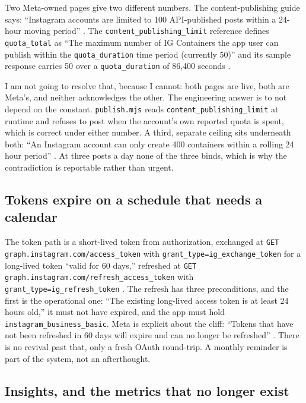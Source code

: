 \documentclass[10pt,letterpaper,twocolumn]{article}
\newcommand{\code}[1]{\texttt{#1}}
\begin{document}
Two Meta-owned pages give two different numbers. The content-publishing guide
says: ``Instagram accounts are limited to 100 API-published posts within a
24-hour moving period'' \cite{metaPublishing}. The
\code{content\_publishing\_limit} reference defines \code{quota\_total} as ``The
maximum number of IG Containers the app user can publish within the
\code{quota\_duration} time period (currently 50)'' and its sample response
carries 50 over a \code{quota\_duration} of 86,400 seconds \cite{metaLimit}.

I am not going to resolve that, because I cannot: both pages are live, both are
Meta's, and neither acknowledges the other. The engineering answer is to not
depend on the constant. \code{publish.mjs} reads
\code{content\_publishing\_limit} at runtime and refuses to post when the
account's own reported quota is spent, which is correct under either number. A
third, separate ceiling sits underneath both: ``An Instagram account can only
create 400 containers within a rolling 24 hour period'' \cite{metaMedia}. At
three posts a day none of the three binds, which is why the contradiction is
reportable rather than urgent.

\subsection{Tokens expire on a schedule that needs a calendar}

The token path is a short-lived token from authorization, exchanged at
\code{GET graph.\allowbreak instagram.\allowbreak com/\allowbreak access\_token} with
\code{grant\_type=ig\_exchange\_token} for a long-lived token ``valid for 60
days,'' refreshed at \code{GET graph.\allowbreak instagram.\allowbreak com/\allowbreak refresh\_\allowbreak access\_token} with
\code{grant\_type=ig\_refresh\_token} \cite{metaBusinessLogin}. The refresh has
three preconditions, and the first is the operational one: ``The existing
long-lived access token is at least 24 hours old,'' it must not have expired,
and the app must hold \code{instagram\_business\_basic}. Meta is explicit about
the cliff: ``Tokens that have not been refreshed in 60 days will expire and can
no longer be refreshed'' \cite{metaBusinessLogin}. There is no revival past
that, only a fresh OAuth round-trip. A monthly reminder is part of the system,
not an afterthought.

\subsection{Insights, and the metrics that no longer exist}
\end{document}
